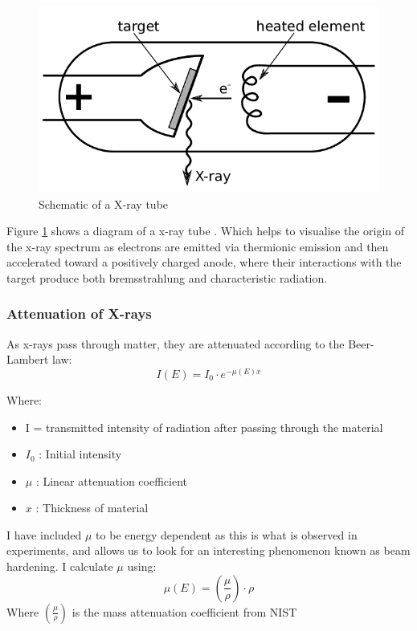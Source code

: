 \documentclass{article}
\theoremstyle{definition}
\begin{document}
\begin{figure}
  \includegraphics[width=\linewidth]{xray_tube.png}
  \caption{Schematic of a X-ray tube}
  \label{fig:X-ray tube}
\end{figure}

Figure \ref{fig:X-ray tube} \cite{Mason} shows a diagram of a x-ray tube . Which helps to visualise the origin of the x-ray spectrum as electrons are emitted via thermionic emission and then accelerated toward a positively charged anode, where their interactions with the target produce both bremsstrahlung and characteristic radiation.

\subsubsection{Attenuation of X-rays}
As x-rays pass through matter, they are attenuated according to the Beer-Lambert law: 
\begin{equation} \label{bl}
I(E) = I_0 \cdot e^{-\mu(E) x}
\end{equation}

Where:
\begin{itemize}
  \item I = transmitted intensity of radiation after passing through the material
  \item $I_0$ : Initial intensity
  \item $\mu$ : Linear attenuation coefficient
  \item $x$ : Thickness of material
\end{itemize}

I have included  $\mu$ to be energy dependent as this is what is observed in experiments, and allows us to look for an interesting phenomenon known as beam hardening. I calculate $\mu$ using:
\begin{equation} \label{linearatt}
\mu(E) = \left(\frac{\mu}{\rho}\right) \cdot \rho
\end{equation}
Where $\left(\frac{\mu}{\rho}\right)$ is the mass attenuation coefficient from NIST \cite{nistXRayMass}
\end{document}
